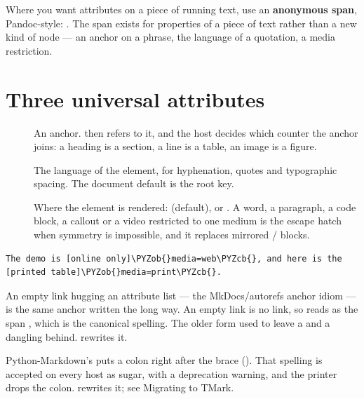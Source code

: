 \documentclass[a4paper,twoside]{article}
\begin{document}
Where you want attributes on a piece of running text, use an \textbf{anonymous span},
Pandoc-style: . The span exists for properties of a piece of text
rather than a new kind of node --- an anchor on a phrase, the language of a
quotation, a media restriction.
\section{Three universal attributes}
\begin{description}
\item[{}] An anchor.  then refers to it, and the host decides which counter the
anchor joins: a heading is a section, a  line is a table, an image
is a figure.
\item[{}] The language of the element, for hyphenation, quotes and typographic
spacing. The document default is the root  key.
\item[{}] Where the element is rendered:  (default),  or . A word, a
paragraph, a code block, a callout or a video restricted to one medium is
the escape hatch when symmetry is impossible, and it replaces mirrored
 /  blocks.
\end{description}
\begin{tscode}[lang=md, engine=pygments]
\begin{Verbatim}[commandchars=\\\{\},breaklines, breakanywhere, commandchars=\\\{\}]
The demo is [online only]\PYZob{}media=web\PYZcb{}, and here is the [printed table]\PYZob{}media=print\PYZcb{}.
\end{Verbatim}
\end{tscode}
\begin{tscallout}[kind=note, title={\tscodeinline{[]()\{\#id\}} is deprecated}]
An empty link hugging an attribute list --- the MkDocs/autorefs anchor idiom
--- is the same anchor written the long way. An empty link is no link, so
 reads as the span , which is the canonical spelling.
The older form used to leave a  and a dangling  behind.
 rewrites it.
\end{tscallout}
\begin{tscallout}[kind=note, title={\tscodeinline{\{: .class\}} is deprecated}]
Python-Markdown's  puts a colon right after the brace
(). That spelling is accepted on every host as sugar, with a
deprecation warning, and the printer drops the colon.
 rewrites it; see
Migrating to TMark.
\end{tscallout}
\end{document}
